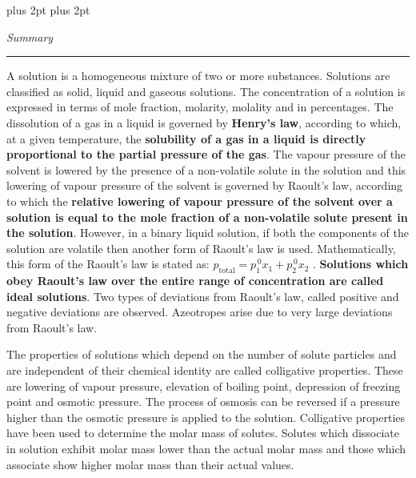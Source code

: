 \documentclass[11pt,a4paper]{article}
\renewcommand{\normalsize}{\fontsize{10.5bp}{12.7bp}\selectfont\abovedisplayskip=4pt plus 2pt\belowdisplayskip=4pt plus 2pt\abovedisplayshortskip=2pt\belowdisplayshortskip=2pt}
\begin{document}
\normalsize


\begin{tcolorbox}[enhanced,colback=white,colframe=gray!40,boxrule=0.8pt,arc=2mm,left=14pt,right=34pt,top=4pt,bottom=6pt,boxsep=0pt,width=0.94\textwidth,drop fuzzy shadow=gray!40,overlay={\fill[YellowGreen] ([xshift=-14pt]frame.south east) rectangle (frame.north east);}]
\hfill{\Large\itshape Summary}\\[-4pt]
\mbox{}\hfill{\color{YellowGreen}\rule{0.22\linewidth}{0.8pt}}

A solution is a homogeneous mixture of two or more substances. Solutions are classified as solid, liquid and gaseous solutions. The concentration of a solution is expressed in terms of mole fraction, molarity, molality and in percentages. The dissolution of a gas in a liquid is governed by \textbf{Henry's law}, according to which, at a given temperature, the \textbf{solubility of a gas in a liquid is directly proportional to the partial pressure of the gas}. The vapour pressure of the solvent is lowered by the presence of a non-volatile solute in the solution and this lowering of vapour pressure of the solvent is governed by Raoult's law, according to which the \textbf{relative lowering of vapour pressure of the solvent over a solution is equal to the mole fraction of a non-volatile solute present in the solution}. However, in a binary liquid solution, if both the components of the solution are volatile then another form of Raoult's law is used. Mathematically, this form of the Raoult's law is stated as: $p_{\text{total}} = p_1^{\,0}x_1 + p_2^{\,0}x_2$ . \textbf{Solutions which obey Raoult's law over the entire range of concentration are called ideal solutions}. Two types of deviations from Raoult's law, called positive and negative deviations are observed. Azeotropes arise due to very large deviations from Raoult's law.

\hspace*{1.5em}The properties of solutions which depend on the number of solute particles and are independent of their chemical identity are called colligative properties. These are lowering of vapour pressure, elevation of boiling point, depression of freezing point and osmotic pressure. The process of osmosis can be reversed if a pressure higher than the osmotic pressure is applied to the solution. Colligative properties have been used to determine the molar mass of solutes. Solutes which dissociate in solution exhibit molar mass lower than the actual molar mass and those which associate show higher molar mass than their actual values.


\end{tcolorbox}
\end{document}
